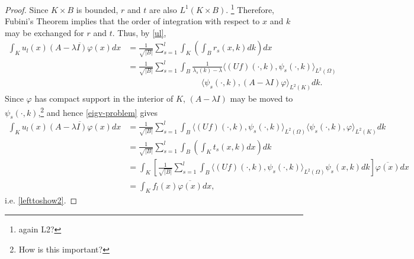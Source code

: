 \begin{theorem}
\begin{proof}
		Since $K \times B$ is bounded, $r$ and $t$ are also $L^{1}(K \times B)$. \footnote{again L2?} Therefore, Fubini's Theorem implies that the order of integration with respect to $x$ and $k$ may be exchanged for $r$ and $t$. Thus, by \eqref{ul}, %
			\begin{align*}
				\int_{K} u_{l}(x) \overline{(A - \lambda I) \varphi(x)} dx & = \frac{1}{\sqrt{|B|}} \sum_{s=1}^{l} \int_{K} \left( \int_{B} r_{s}(x, k) dk \right) dx \\
					& = \frac{1}{\sqrt{|B|}} \sum_{s=1}^{l} \int_{B} \frac{1}{\lambda_{s}(k) - \lambda} \langle (Uf)(\cdot, k), \psi_{s}(\cdot, k) \rangle_{L^{2}(\Omega)} \\
					& ~\qquad ~\qquad ~\qquad ~\qquad \langle \psi_{s}(\cdot, k), (A - \lambda I) \varphi \rangle_{L^{2}(K)} dk. 
			\end{align*}
			Since $\varphi$ has compact support in the interior of $K$, $(A - \lambda I)$ may be moved to $\psi_{s}(\cdot, k)$,\footnote{How is this important?} and hence \eqref{eigv-problem} gives %
			\begin{align*}
				\int_{K} u_{l}(x) \overline{(A - \lambda I) \varphi(x)} dx					& = \frac{1}{\sqrt{|B|}} \sum_{s=1}^{l} \int_{B} \langle (Uf)(\cdot, k), \psi_{s}(\cdot, k) \rangle_{L^{2}(\Omega)} \langle \psi_{s}(\cdot, k), \varphi \rangle_{L^{2}(K)} dk \\
				 	& = \frac{1}{\sqrt{|B|}} \sum_{s=1}^{l} \int_{B} \left( \int_{K} t_{s}(x, k) dx \right) dk \\
					& = \int_{K} \left[ \frac{1}{\sqrt{|B|}} \sum_{s=1}^{l} \int_{B} \langle (Uf)(\cdot, k), \psi_{s}(\cdot, k) \rangle_{L^{2}(\Omega)} \psi_{s}(x, k) dk \right] \overline{\varphi(x)} dx \\
					& = \int_{K} f_{l}(x) \overline{\varphi(x)} dx,
			\end{align*}
			i.e. \eqref{lefttoshow2}.
	\end{proof}
\end{theorem}